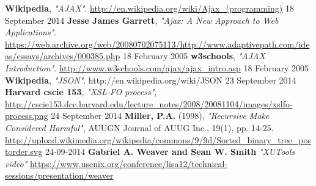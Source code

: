 \begin{thebibliography}{9}

   \textbf{Wikipedia},
   \emph{"AJAX"}.
   \url{http://en.wikipedia.org/wiki/Ajax\_(programming)}
   18 September 2014 
   \textbf{Jesse James Garrett},
   \emph{"Ajax: A New Approach to Web Applications"}.
   \url{https://web.archive.org/web/20080702075113/http://www.adaptivepath.com/ideas/essays/archives/000385.php}
   18 February 2005
   \textbf{w3schools},
   \emph{"AJAX Introduction"}.
   \url{http://www.w3schools.com/ajax/ajax\_intro.asp}
   18 February 2005
   \textbf{Wikipedia},
   \emph{"JSON"}.
   http://en.wikipedia.org/wiki/JSON
   23 September 2014
  \textbf{Harvard cscie 153},
  \emph{"XSL-FO process"},
  \url{http://cscie153.dce.harvard.edu/lecture\_notes/2008/20081104/images/xslfo-process.png}
  24 September 2014
  \textbf{Miller, P.A.} (1998), 
  \emph{"Recursive Make Considered Harmful"},
  AUUGN Journal of AUUG Inc., 19(1), pp. 14-25.
  \url{http://upload.wikimedia.org/wikipedia/commons/9/9d/Sorted_binary_tree_postorder.svg}
  24-09-2014
  \textbf{Gabriel A. Weaver and Sean W. Smith}
  \emph{"XUTools video"}
  \url{https://www.usenix.org/conference/lisa12/technical-sessions/presentation/weaver}
\end{thebibliography}

